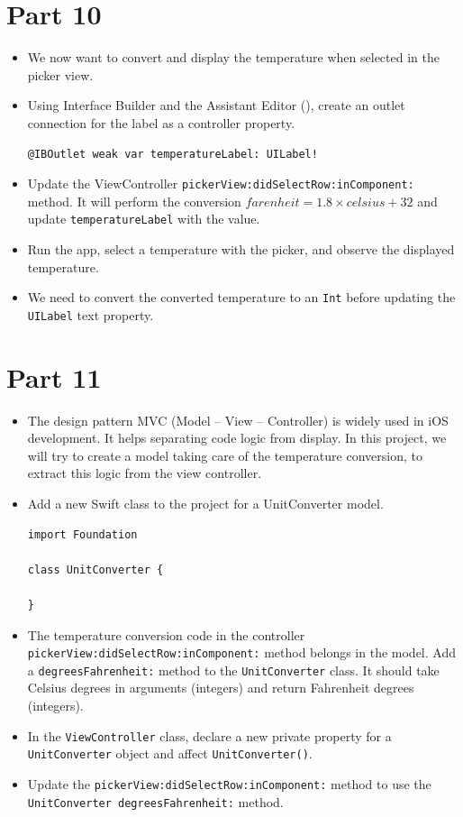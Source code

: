 \documentclass[a4paper,11pt]{scrartcl}
\begin{document}
\section*{Part 10}

\begin{itemize}
\item We now want to convert and display the temperature when selected in the picker view.
\item Using Interface Builder and the Assistant Editor (\keys{\Alt+\cmd+\return}), create an outlet connection for the label as a controller property.
\begin{lstlisting}
@IBOutlet weak var temperatureLabel: UILabel!
\end{lstlisting}
\item Update the ViewController \texttt{pickerView:didSelectRow:inComponent:} method. It will perform the conversion $farenheit=1.8\times celsius+32$ and update \texttt{temperatureLabel} with the value.
\item Run the app, select a temperature with the picker, and observe the displayed temperature.
\item We need to convert the converted temperature to an \texttt{Int} before updating the \texttt{UILabel} text property.
\end{itemize}

\section*{Part 11}

\begin{itemize}
\item The design pattern MVC (Model – View – Controller) is widely used in iOS development. It helps separating code logic from display. In this project, we will try to create a model taking care of the temperature conversion, to extract this logic from the view controller.
\item Add a new Swift class to the project for a UnitConverter model.
\begin{lstlisting}
import Foundation

class UnitConverter {

}
\end{lstlisting}
\item The temperature conversion code in the controller \texttt{pickerView:didSelectRow:inComponent:} method belongs in the model. Add a \texttt{degreesFahrenheit:} method to the \texttt{UnitConverter} class. It should take Celsius degrees in arguments (integers) and return Fahrenheit degrees (integers).
\item In the \texttt{ViewController} class, declare a new private property for a \texttt{UnitConverter} object and affect \texttt{UnitConverter()}.
\item Update the \texttt{pickerView:didSelectRow:inComponent:} method to use the \texttt{UnitConverter degreesFahrenheit:} method.
\end{itemize}
\end{document}
